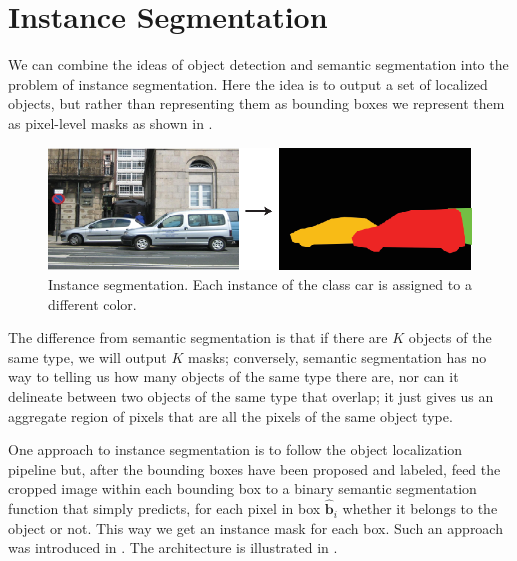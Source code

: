 \section{Instance Segmentation}

We can combine the ideas of object detection and semantic segmentation into the problem of instance segmentation. Here the idea is to output a set of localized objects, but rather than representing them as bounding boxes we represent them as pixel-level masks as shown in \fig{\ref{fig:instance_segmentation}}. 


\begin{figure}
\centerline{
\includegraphics[width=0.6\linewidth]{figures/object_recognition/instance_segmentation.eps}
}
\caption{Instance segmentation. Each instance of the class car is assigned to a different color.}
\label{fig:instance_segmentation}
\end{figure}

The difference from semantic segmentation is that if there are $K$ objects of the same type, we will output $K$ masks; conversely, semantic segmentation has no way to telling us how many objects of the same type there are, nor can it delineate between two objects of the same type that overlap; it just gives us an aggregate region of pixels that are all the pixels of the same object type. 

One approach to instance segmentation is to follow the object localization pipeline but, after the bounding boxes have been proposed and labeled, feed the cropped image within each bounding box to a binary semantic segmentation function that simply predicts, for each pixel in box $\hat{\mathbf{b}}_i$ whether it belongs to the object or not. This way we get an instance mask for each box. Such an approach was introduced in \cite{he2017}. The architecture is illustrated in \fig{\ref{fig:instance_segmentation_architecture}}.

